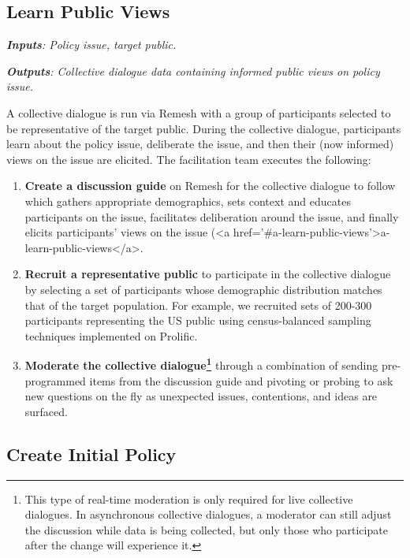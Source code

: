 \documentclass{article}
\begin{document}
\subsection{Learn Public Views}

\begin{tcolorbox}[colback=blue!5!white,colframe=blue!30!white]
\emph{\textbf{Inputs}: Policy issue, target public.}

\emph{\textbf{Outputs}: Collective dialogue data containing informed public views on policy issue.}
\end{tcolorbox}

A collective dialogue is run via Remesh with a group of participants selected to be representative of the target public. During the collective dialogue, participants learn about the policy issue, deliberate the issue, and then their (now informed) views on the issue are elicited. The facilitation team executes the following:

\begin{enumerate}
\item \textbf{Create a discussion guide} on Remesh for the collective dialogue to follow which gathers appropriate demographics, sets context and educates participants on the issue, facilitates deliberation around the issue, and finally elicits participants' views on the issue (<a href='#a-learn-public-views'>a-learn-public-views</a>.
\item \textbf{Recruit a representative public} to participate in the collective dialogue by selecting a set of participants whose demographic distribution matches that of the target population. For example, we recruited sets of 200-300 participants representing the US public using census-balanced sampling techniques implemented on Prolific.
\item \textbf{Moderate the collective dialogue\footnote{This type of real-time moderation is only required for live collective dialogues. In asynchronous collective dialogues, a moderator can still adjust the discussion while data is being collected, but only those who participate after the change will experience it.}} through a combination of sending pre-programmed items from the discussion guide and pivoting or probing to ask new questions on the fly as unexpected issues, contentions, and ideas are surfaced. 
\end{enumerate}


\subsection{Create Initial Policy}
\end{document}
